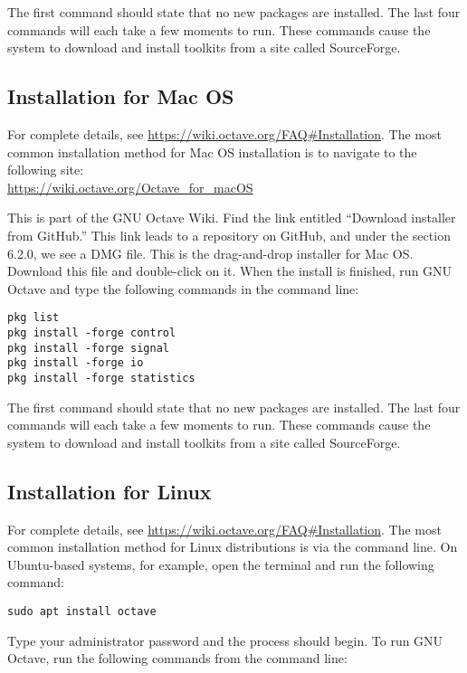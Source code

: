 \documentclass[10pt]{article}
\begin{document}
The first command should state that no new packages are installed.  The last four commands will each take a few moments to run.  These commands cause the system to download and install toolkits from a site called SourceForge.

\subsection{Installation for Mac OS}

For complete details, see \url{https://wiki.octave.org/FAQ#Installation}.  The most common installation method for Mac OS installation is to navigate to the following site: \\

\url{https://wiki.octave.org/Octave_for_macOS}

This is part of the GNU Octave Wiki.  Find the link entitled ``Download installer from GitHub.''  This link leads to a repository on GitHub, and under the section 6.2.0, we see a DMG file.  This is the drag-and-drop installer for Mac OS.  Download this file and double-click on it.  When the install is finished, run GNU Octave and type the following commands in the command line:

\begin{verbatim}
pkg list
pkg install -forge control
pkg install -forge signal
pkg install -forge io
pkg install -forge statistics
\end{verbatim}

The first command should state that no new packages are installed.  The last four commands will each take a few moments to run.  These commands cause the system to download and install toolkits from a site called SourceForge.

\subsection{Installation for Linux}

For complete details, see \url{https://wiki.octave.org/FAQ#Installation}.  The most common installation method for Linux distributions is via the command line.  On Ubuntu-based systems, for example, open the terminal and run the following command:

\begin{verbatim}
sudo apt install octave
\end{verbatim}

Type your administrator password and the process should begin.  To run GNU Octave, run the following commands from the command line:
\end{document}
